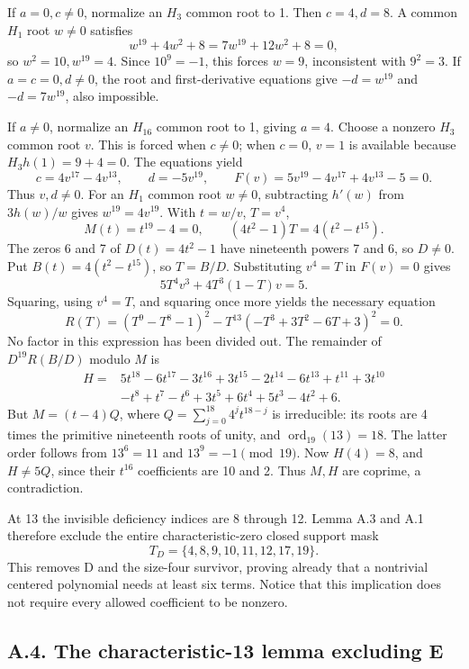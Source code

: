 \documentclass[
  british,
  10pt,
  a4paper,
]{article}
\begin{document}
If \(a=0,c\ne0\), normalize an \(H_3\) common root to 1. Then
\(c=4,d=8\). A common \(H_1\) root \(w\ne0\) satisfies \[
w^{19}+4w^2+8=7w^{19}+12w^2+8=0,
\] so \(w^2=10,w^{19}=4\). Since \(10^9=-1\), this forces \(w=9\),
inconsistent with \(9^2=3\). If \(a=c=0,d\ne0\), the root and
first-derivative equations give \(-d=w^{19}\) and \(-d=7w^{19}\), also
impossible.

If \(a\ne0\), normalize an \(H_{16}\) common root to 1, giving \(a=4\).
Choose a nonzero \(H_3\) common root \(v\). This is forced when
\(c\ne0\); when \(c=0\), \(v=1\) is available because \(H_3h(1)=9+4=0\).
The equations yield \[
c=4v^{17}-4v^{13},\qquad d=-5v^{19},
\qquad F(v)=5v^{19}-4v^{17}+4v^{13}-5=0.
\] Thus \(v,d\ne0\). For an \(H_1\) common root \(w\ne0\), subtracting
\(h'(w)\) from \(3h(w)/w\) gives \(w^{19}=4v^{19}\). With \(t=w/v\),
\(T=v^4\), \[
M(t)=t^{19}-4=0,\qquad
(4t^2-1)T=4(t^2-t^{15}).
\] The zeros 6 and 7 of \(D(t)=4t^2-1\) have nineteenth powers 7 and 6,
so \(D\ne0\). Put \(B(t)=4(t^2-t^{15})\), so \(T=B/D\). Substituting
\(v^4=T\) in \(F(v)=0\) gives \[
5T^4v^3+4T^3(1-T)v=5.
\] Squaring, using \(v^4=T\), and squaring once more yields the
necessary equation \[
R(T)=(T^9-T^8-1)^2-T^{13}(-T^3+3T^2-6T+3)^2=0.
\] No factor in this expression has been divided out. The remainder of
\(D^{19}R(B/D)\) modulo \(M\) is \[
\begin{aligned}
H={}&5t^{18}-6t^{17}-3t^{16}+3t^{15}-2t^{14}-6t^{13}
+t^{11}+3t^{10}\\
&-t^8+t^7-t^6+3t^5+6t^4+5t^3-4t^2+6.
\end{aligned}
\tag{S6}
\] But \(M=(t-4)Q\), where \(Q=\sum_{j=0}^{18}4^jt^{18-j}\) is
irreducible: its roots are 4 times the primitive nineteenth roots of
unity, and \(\operatorname{ord}_{19}(13)=18\). The latter order follows
from \(13^6=11\) and \(13^9=-1\pmod{19}\). Now \(H(4)=8\), and
\(H\ne5Q\), since their \(t^{16}\) coefficients are 10 and 2. Thus
\(M,H\) are coprime, a contradiction.

At 13 the invisible deficiency indices are 8 through 12. Lemma A.3 and
A.1 therefore exclude the entire characteristic-zero closed support mask
\[
T_D=\{4,8,9,10,11,12,17,19\}.
\tag{S7}
\] This removes D and the size-four survivor, proving already that a
nontrivial centered polynomial needs at least six terms. Notice that
this implication does not require every allowed coefficient to be
nonzero.

\subsection*{A.4. The characteristic-13 lemma excluding
E}\label{a.4.-the-characteristic-13-lemma-excluding-e}
\end{document}
